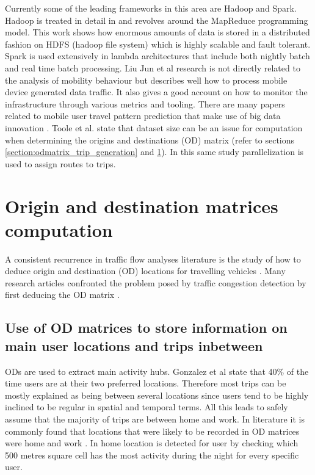 \documentclass[12pt, a4paper]{report}
\theoremstyle{definition}
\theoremstyle{definition}%
\theoremstyle{definition}%
\theoremstyle{definition}%
\theoremstyle{definition}%
\theoremstyle{definition}%
\begin{document}
Currently some of the leading frameworks in this area are Hadoop and Spark. Hadoop is treated in detail in \cite{Liu2014} and revolves around the MapReduce programming model. This work shows how enormous amounts of data is stored in a distributed fashion on HDFS (hadoop file system) which is highly scalable and fault tolerant. Spark is used extensively in lambda architectures that include both nightly batch and real time batch processing. Liu Jun et al research is not directly related to the analysis of mobility behaviour but describes well how to process mobile device generated data traffic. It also gives a good account on how to monitor the infrastructure through various metrics and tooling. There are many papers related to mobile user travel pattern prediction that make use of big data innovation  \cite{Liu2014,Laurila2012,Kurien2012}. Toole et al. state that dataset size can be an issue for computation when determining the origins and destinations (OD) matrix (refer to sections \ref{section:odmatrix_trip_generation} and \ref{section:OD_Matrices}). In this same study parallelization is used to assign routes to trips.


\section{Origin and destination matrices computation} \label{section:OD_Matrices}
A consistent recurrence in traffic flow analyses literature is the study of how to deduce origin and destination (OD) locations for travelling vehicles \cite{Iqbal2014}. Many research articles confronted the problem posed by traffic congestion detection by first deducing the OD matrix \cite{Toole2015,Iqbal2014,Alexander2015,Calabrese2011,Calabrese2013,Colak2015}. 

\subsection{Use of OD matrices to store information on main user locations and trips inbetween}

ODs are used to extract main activity hubs. Gonzalez et al state that 40\% of the time users are at their two preferred locations.  Therefore most trips can be mostly explained as being  between several locations since users tend to be highly inclined to be regular in spatial and temporal terms. All this leads to safely assume that the majority of trips are between home and work. In literature it  is commonly found that locations that were likely to be recorded in OD matrices were home and work \cite{Calabrese2011,Colak2015}.  In \cite{Calabrese2011} home location is detected for user by checking which 500 metres square cell has the most activity during the night for every specific user.
\end{document}
